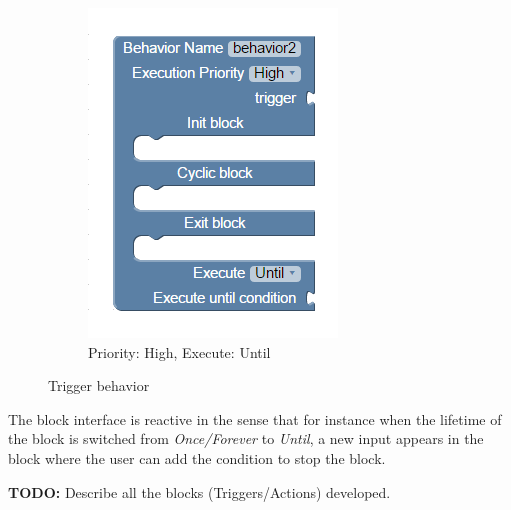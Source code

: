 \begin{figure}[H]
\begin{subfigure}[t]{0.38\textwidth}
\includegraphics[width=\textwidth]{../thesis/assets/blocks_behavior2.png}
\caption[Example 2]{Priority: High, Execute: Until}
\label{fig:program_blocks}
\end{subfigure}
\caption[Trigger behavior]{Trigger behavior}
\label{fig:blocks_trigger}
\end{figure}
The block interface is reactive in the sense that for instance when the lifetime of the block is switched from \emph{Once/Forever} to \emph{Until}, a new input appears in the block where the user can add the condition to stop the block.

\textbf{TODO: } Describe all the blocks (Triggers/Actions) developed.

